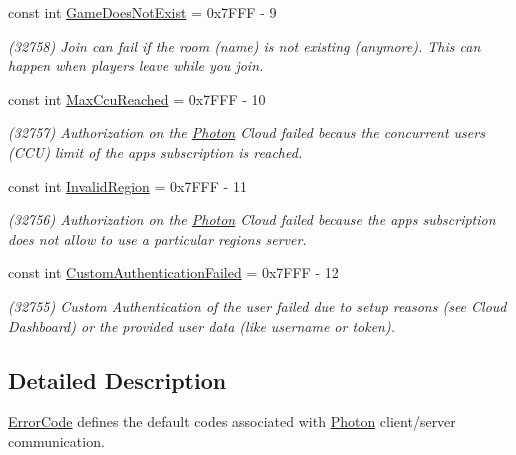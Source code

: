 \begin{DoxyCompactItemize}
const int \hyperlink{class_exit_games_1_1_client_1_1_photon_1_1_chat_1_1_error_code_a305ae576c8bcc601f64595333623287a}{Game\+Does\+Not\+Exist} = 0x7\+F\+F\+F -\/ 9
\begin{DoxyCompactList}\small\item\em (32758) Join can fail if the room (name) is not existing (anymore). This can happen when players leave while you join.\end{DoxyCompactList}\item 
const int \hyperlink{class_exit_games_1_1_client_1_1_photon_1_1_chat_1_1_error_code_ab1d9ee69b2b2f4112c84e6d3c2c54b6c}{Max\+Ccu\+Reached} = 0x7\+F\+F\+F -\/ 10
\begin{DoxyCompactList}\small\item\em (32757) Authorization on the \hyperlink{namespace_exit_games_1_1_client_1_1_photon}{Photon} Cloud failed becaus the concurrent users (C\+CU) limit of the app\textquotesingle{}s subscription is reached. \end{DoxyCompactList}\item 
const int \hyperlink{class_exit_games_1_1_client_1_1_photon_1_1_chat_1_1_error_code_af2c3cf51125257fba0d2d9f76cbb55f1}{Invalid\+Region} = 0x7\+F\+F\+F -\/ 11
\begin{DoxyCompactList}\small\item\em (32756) Authorization on the \hyperlink{namespace_exit_games_1_1_client_1_1_photon}{Photon} Cloud failed because the app\textquotesingle{}s subscription does not allow to use a particular region\textquotesingle{}s server. \end{DoxyCompactList}\item 
const int \hyperlink{class_exit_games_1_1_client_1_1_photon_1_1_chat_1_1_error_code_a112f0f8b62f7271dfc9793463f389482}{Custom\+Authentication\+Failed} = 0x7\+F\+F\+F -\/ 12
\begin{DoxyCompactList}\small\item\em (32755) Custom Authentication of the user failed due to setup reasons (see Cloud Dashboard) or the provided user data (like username or token). \end{DoxyCompactList}\end{DoxyCompactItemize}


\subsection{Detailed Description}
\hyperlink{class_exit_games_1_1_client_1_1_photon_1_1_chat_1_1_error_code}{Error\+Code} defines the default codes associated with \hyperlink{namespace_exit_games_1_1_client_1_1_photon}{Photon} client/server communication. 



